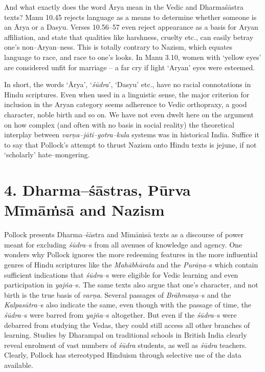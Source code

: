 And what exactly does the word Ārya mean in the Vedic and Dharmaśāstra texts? Manu 10.45 rejects language as a means to determine whether someone is an Ārya or a Dasyu. Verses 10.56–57 even reject appearance as a basis for Aryan affiliation, and state that qualities like harshness, cruelty etc., can easily betray one’s non–Aryan–ness. This is totally contrary to Nazism, which equates language to race, and race to one’s looks. In Manu 3.10, women with ‘yellow eyes’ are considered unfit for marriage – a far cry if light ‘Aryan’ eyes were esteemed.

In short, the words ‘Ārya’, ‘\textit{śūdra}’, ‘Dasyu’ etc., have no racial connotations in Hindu scriptures. Even when used in a linguistic sense, the major criterion for inclusion in the Aryan category seems adherence to Vedic orthopraxy, a good character, noble birth and so on. We have not even dwelt here on the argument on how complex (and often with no basis in social reality) the theoretical interplay between \textit{varṇa–jāti–gotra–kula} systems was in historical India. Suffice it to say that Pollock’s attempt to thrust Nazism onto Hindu texts is jejune, if not ‘scholarly’ hate–mongering.


\section*{4. Dharma–śāstras, Pūrva Mīmāṁsā and Nazism}

Pollock presents Dharma–śāstra and Mīmāṁsā texts as a discourse of power meant for excluding \textit{śūdra}–s from all avenues of knowledge and agency. One wonders why Pollock ignores the more redeeming features in the more influential genres of Hindu scriptures like the \textit{Mahābhārata} and the \textit{Purāṇa}–s which contain sufficient indications that \textit{śūdra}–s were eligible for Vedic learning and even participation in \textit{yajña}–s. The same texts also argue that one’s character, and not birth is the true basis of \textit{varṇa}. Several passages of \textit{Brāhmaṇa}–s and the \textit{Kalpasūtra}–s also indicate the same, even though with the passage of time, the \textit{śūdra}–s were barred from \textit{yajña}–s altogether. But even if the \textit{śūdra}–s were debarred from studying the Vedas, they could still access all other branches of learning. Studies by Dharampal on traditional schools in British India clearly reveal enrolment of vast numbers of \textit{śūdra} students, as well as \textit{śūdra} teachers. Clearly, Pollock has stereotyped Hinduism through selective use of the data available.

